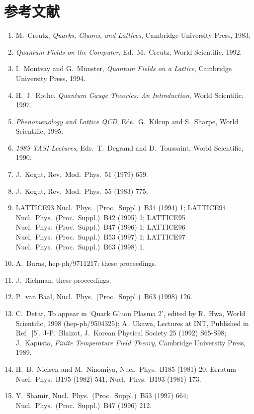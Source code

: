 \chapter*{参考文献}

\begin{enumerate}
\renewcommand{\labelenumi}{[\arabic{enumi}]}
\item M.~Creutz, \textit{Quarks, Gluons, and Lattices}, Cambridge University Press, 1983.
\item \textit{Quantum Fields on the Computer}, Ed.~M.~Creutz, World Scientific, 1992.
\item I.~Montvay and G.~M\"unster, \textit{Quantum Fields on a Lattice}, Cambridge University Press, 1994.
\item H.~J.~Rothe, \textit{Quantum Gauge Theories: An Introduction}, World Scientific, 1997.
\item \textit{Phenomenology and Lattice QCD}, Eds.~G.~Kilcup and S.~Sharpe, World Scientific, 1995.
\item \textit{1989 TASI Lectures}, Eds.~T.~Degrand and D.~Toussaint, World Scientific, 1990.
\item J.~Kogut, Rev.\ Mod.\ Phys.\ 51 (1979) 659.
\item J.~Kogut, Rev.\ Mod.\ Phys.\ 55 (1983) 775.
\item LATTICE93 Nucl.\ Phys.\ (Proc.\ Suppl.)\ B34 (1994) 1; LATTICE94 Nucl.\ Phys.\ (Proc.\ Suppl.)\ B42 (1995) 1; LATTICE95 Nucl.\ Phys.\ (Proc.\ Suppl.)\ B47 (1996) 1; LATTICE96 Nucl.\ Phys.\ (Proc.\ Suppl.)\ B53 (1997) 1; LATTICE97 Nucl.\ Phys.\ (Proc.\ Suppl.)\ B63 (1998) 1.
\item A.~Buras, hep-ph/9711217; these proceedings.
\item J.~Richman, these proceedings.
\item P.~van Baal, Nucl.\ Phys.\ (Proc.\ Suppl.)\ B63 (1998) 126.
\item C.~Detar, To appear in `Quark Gluon Plasma 2', edited by R.~Hwa, World Scientific, 1998 (hep-ph/9504325); A.~Ukawa, Lectures at INT, Published in Ref.~[5]. J-P.~Blaizot, J.~Korean Physical Society 25 (1992) S65-S98; J.~Kapusta, \textit{Finite Temperature Field Theory}, Cambridge University Press, 1989.
\item H.~B.~Nielsen and M.~Ninomiya, Nucl.\ Phys.\ B185 (1981) 20; Erratum Nucl.\ Phys.\ B195 (1982) 541; Nucl.\ Phys.\ B193 (1981) 173.
\item Y.~Shamir, Nucl.\ Phys.\ (Proc.\ Suppl.)\ B53 (1997) 664; Nucl.\ Phys.\ (Proc.\ Suppl.)\ B47 (1996) 212.

\end{enumerate}
